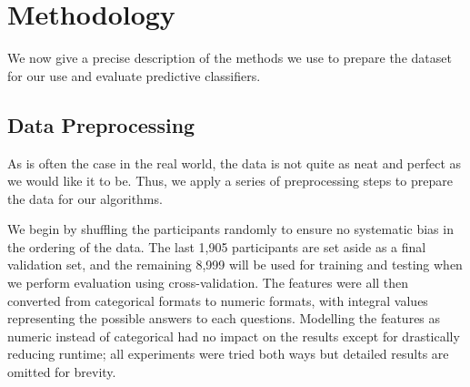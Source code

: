 \section{Methodology}
\label{sec:methods}

We now give a precise description of the methods we use to prepare the dataset for our use and evaluate predictive classifiers.

\subsection{Data Preprocessing}

As is often the case in the real world, the data is not quite as neat and perfect as we would like it to be.  Thus, we apply a series of preprocessing steps to prepare the data for our algorithms.

We begin by shuffling the participants randomly to ensure no systematic bias in the ordering of the data.  The last 1,905 participants are set aside as a final validation set, and the remaining 8,999 will be used for training and testing when we perform evaluation using cross-validation.  The features were all then converted from categorical formats to numeric formats, with integral values representing the possible answers to each questions. Modelling the features as numeric instead of categorical had no impact on the results except for drastically reducing runtime; all experiments were tried both ways but detailed results are omitted for brevity.


